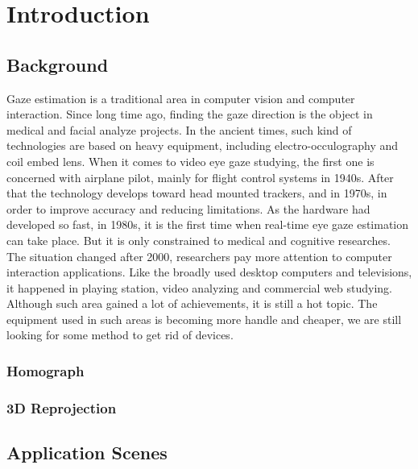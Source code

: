 \documentclass[senior]{IPSstyle}
\begin{document}
 \makepreliminarypages
 \singlespace
 \frontmatter
 \tableofcontents
 \listoffigures
 \listoftables
 \mainmatter
 \clearemptydoublepage
 \setlength{\baselineskip}{23.0pt}

\chapter{Introduction} \label{introduction}



\section{Background}


% 
Gaze estimation is a traditional area in computer vision and computer interaction. Since long time ago, finding the gaze direction is the object in medical and facial analyze projects. In the ancient times, such kind of technologies are based on heavy equipment, including electro-occulography and coil embed lens. When it comes to video eye gaze studying\cite{mohamed2007history}, the first one is concerned with airplane pilot, mainly for flight control systems in 1940s. After that the technology develops toward head mounted trackers, and in 1970s, in order to improve accuracy and reducing limitations. As the hardware had developed so fast, in 1980s, it is the first time when real-time eye gaze estimation can take place. But it is only constrained to medical and cognitive researches\cite{borji2013state}. The situation changed after 2000, researchers pay more attention to computer interaction applications. Like the broadly used desktop computers and televisions, it happened in playing station, video analyzing and commercial web studying.
Although such area gained a lot of achievements, it is still a hot topic. The equipment used in such areas is becoming more handle and cheaper, we are still looking for some method to get rid of devices.

\subsection{Homograph}

\subsection{3D Reprojection}

\section{Application Scenes}
\end{document}
